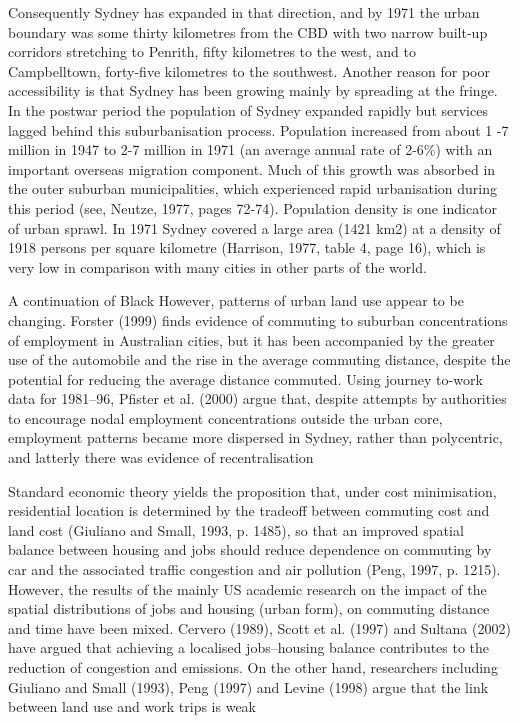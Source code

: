 Consequently Sydney has expanded in that direction, and by 1971 the urban boundary was some thirty kilometres from the CBD with two narrow built-up corridors stretching to Penrith, fifty kilometres to the west, and to Campbelltown, forty-five kilometres to the southwest. Another reason for poor accessibility is that Sydney has been growing mainly by spreading at the fringe. In the postwar period the population of Sydney expanded rapidly but services lagged behind this suburbanisation process. Population increased from about 1 -7 million in 1947 to 2-7 million in 1971 (an average annual rate of 2-6\%) with an important overseas migration component. Much of this growth was absorbed in the outer suburban municipalities, which experienced rapid urbanisation during this period (see, Neutze, 1977, pages 72-74). Population density is one indicator of urban sprawl. In 1971 Sydney covered a large area (1421 km2) at a density of 1918 persons per square kilometre (Harrison, 1977, table 4, page 16), which is very low in comparison with many cities in other parts of the world. 

\cite{watts2009impact} A continuation of Black
However, patterns of urban land use appear
to be changing. Forster (1999) finds evidence
of commuting to suburban concentrations of
employment in Australian cities, but it has been accompanied by the greater use of the automobile and the rise in the average commuting distance, despite the potential for reducing the average distance commuted. Using journey to-work data for 1981–96, Pfister et al. (2000) argue that, despite attempts by authorities to encourage nodal employment concentrations outside the urban core, employment patterns became more dispersed in Sydney, rather than polycentric, and latterly there was evidence of recentralisation

Standard economic theory yields the proposition that, under cost minimisation, residential location is determined by the tradeoff between commuting cost and land cost (Giuliano and Small, 1993, p. 1485), so that an improved spatial balance between housing and jobs should reduce dependence on commuting by car and the associated traffic congestion and air pollution (Peng, 1997, p. 1215). However, the results of the mainly US academic research on the impact of the spatial distributions of jobs and housing (urban form), on commuting distance and time have been mixed. Cervero (1989), Scott et al. (1997) and Sultana (2002) have argued that achieving a localised jobs–housing balance contributes to the reduction of congestion and emissions. On the other hand, researchers including Giuliano and Small (1993), Peng (1997) and Levine (1998) argue that the link between land use and work trips is weak 

